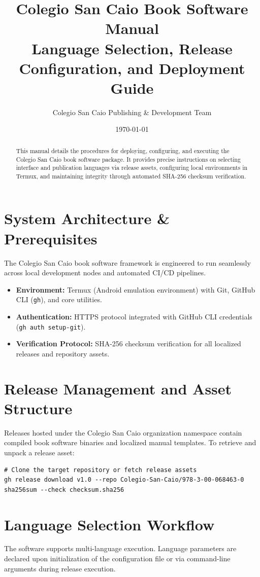\documentclass[11pt, a4paper]{article}
\title{\textbf{Colegio San Caio Book Software Manual}\\\large Language Selection, Release Configuration, and Deployment Guide}
\author{Colegio San Caio Publishing & Development Team}
\date{\today}
\begin{document}
\maketitle

\begin{abstract}
This manual details the procedures for deploying, configuring, and executing the Colegio San Caio book software package. It provides precise instructions on selecting interface and publication languages via release assets, configuring local environments in Termux, and maintaining integrity through automated SHA-256 checksum verification.
\end{abstract}

\section{System Architecture & Prerequisites}
The Colegio San Caio book software framework is engineered to run seamlessly across local development nodes and automated CI/CD pipelines. 

\begin{itemize}
    \item \textbf{Environment:} Termux (Android emulation environment) with Git, GitHub CLI (\texttt{gh}), and core utilities.
    \item \textbf{Authentication:} HTTPS protocol integrated with GitHub CLI credentials (\texttt{gh auth setup-git}).
    \item \textbf{Verification Protocol:} SHA-256 checksum verification for all localized releases and repository assets.
\end{itemize}

\section{Release Management and Asset Structure}
Releases hosted under the Colegio San Caio organization namespace contain compiled book software binaries and localized manual templates. To retrieve and unpack a release asset:

\begin{verbatim}
# Clone the target repository or fetch release assets
gh release download v1.0 --repo Colegio-San-Caio/978-3-00-068463-0
sha256sum --check checksum.sha256
\end{verbatim}

\section{Language Selection Workflow}
The software supports multi-language execution. Language parameters are declared upon initialization of the configuration file or via command-line arguments during release execution.
\end{document}
